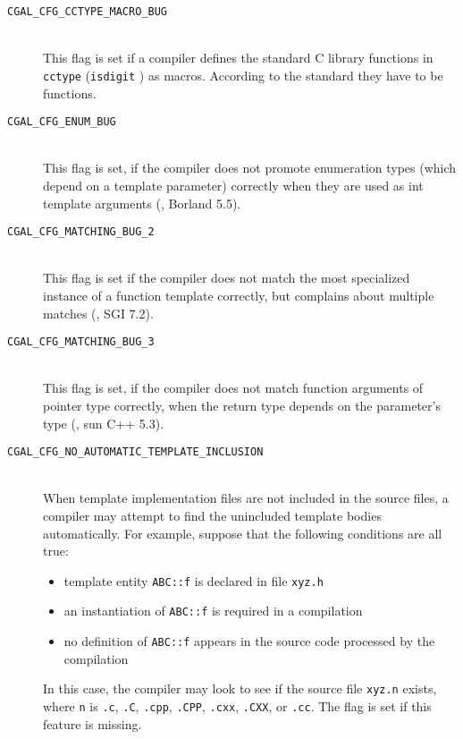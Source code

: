 \begin{description}
\item[{\tt CGAL\_CFG\_CCTYPE\_MACRO\_BUG}]~\\
 This flag is set if a compiler defines the
 standard C library functions in {\tt cctype} ({\tt isdigit} \etc) as macros.
 According to the standard they have to be functions.

\item[{\tt CGAL\_CFG\_ENUM\_BUG}]~\\
 This flag is set, if the compiler does not promote enumeration types
 (which depend on a template parameter) correctly when they are used
 as int template arguments (\eg, Borland 5.5).

\item[{\tt CGAL\_CFG\_MATCHING\_BUG\_2}]~\\
 This flag is set if the compiler does not match the most
 specialized instance of a function template correctly,
 but complains about multiple matches
 (\eg, SGI 7.2).

\item[{\tt CGAL\_CFG\_MATCHING\_BUG\_3}]~\\
  This flag is set, if the compiler does not match function arguments 
  of pointer type correctly, when the return type depends on 
  the parameter's type (\eg, sun C++ 5.3).

\item[{\tt CGAL\_CFG\_NO\_AUTOMATIC\_TEMPLATE\_INCLUSION}]~\\
 When template implementation files are not included in the source files,
 a compiler may attempt to find the unincluded template bodies
 automatically. For example, suppose that the following conditions are
 all true:
 \begin{itemize}
 \item template entity {\tt ABC::f} is declared in file {\tt xyz.h}
 \item an instantiation of {\tt ABC::f} is required in a compilation
 \item no definition of {\tt ABC::f} appears in the source code processed by
       the compilation
 \end{itemize}
 In this case, the compiler may look to see if the source file {\tt xyz.n}
 exists, where {\tt n} is {\tt .c}, {\tt .C}, {\tt .cpp}, {\tt .CPP}, 
 {\tt .cxx}, {\tt .CXX}, or {\tt .cc}. The flag
 is set if this feature is missing.
 


\end{description}
